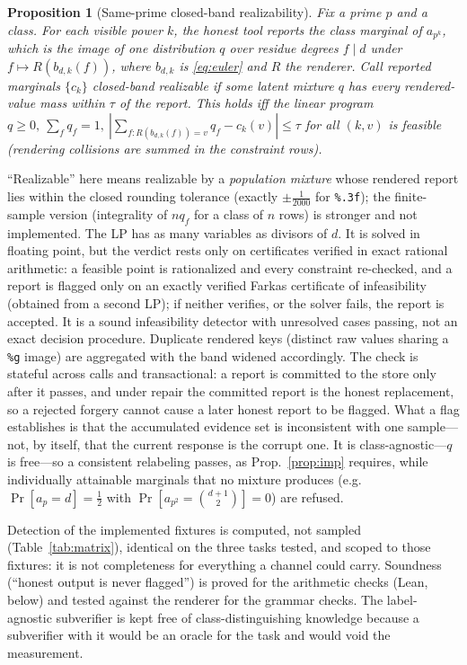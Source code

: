 \documentclass[conference]{IEEEtran}
\newtheorem{proposition}{Proposition}
\begin{document}
\begin{proposition}[Same-prime closed-band realizability]\label{prop:joint}
Fix a prime $p$ and a class. For each visible power $k$, the honest
tool reports the class marginal of $a_{p^k}$, which is the image of
one distribution $q$ over residue degrees $f\mid d$ under
$f\mapsto R(b_{d,k}(f))$, where $b_{d,k}$ is \eqref{eq:euler} and $R$
the renderer. Call reported marginals $\{c_k\}$ \emph{closed-band
realizable} if some latent mixture $q$ has every rendered-value mass
within $\tau$ of the report. This holds iff the linear program
$q\ge0,\ \sum_f q_f=1,\ |\sum_{f:R(b_{d,k}(f))=v}q_f-c_k(v)|\le\tau$
for all $(k,v)$ is feasible (rendering collisions are summed in the
constraint rows).
\end{proposition}
``Realizable'' here means realizable by a \emph{population mixture}
whose rendered report lies within the closed rounding tolerance
(exactly $\pm\tfrac{1}{2000}$ for \texttt{\%.3f}); the finite-sample
version (integrality of $nq_f$ for a class of $n$ rows) is stronger
and not implemented. The LP has as many variables as divisors of $d$.
It is solved in floating point, but the verdict rests only on
certificates verified in exact rational arithmetic: a feasible point is
rationalized and every constraint re-checked, and a report is flagged
only on an exactly verified Farkas certificate of infeasibility
(obtained from a second LP); if neither verifies, or the solver
fails, the report is accepted. It is a sound infeasibility detector
with unresolved cases passing, not an exact decision procedure.
Duplicate rendered keys (distinct raw values sharing a \texttt{\%g}
image) are aggregated with the band widened accordingly. The check is
stateful across calls and transactional: a report is committed to the
store only after it passes, and under repair the committed report is
the honest replacement, so a rejected forgery cannot cause a later
honest report to be flagged. What a flag establishes is that the
accumulated evidence set is inconsistent with one sample---not, by
itself, that the current response is the corrupt one. It is class-agnostic---$q$ is free---so a consistent
relabeling passes, as Prop.~\ref{prop:imp} requires, while
individually attainable marginals that no mixture produces (e.g.\
$\Pr[a_p{=}d]=\tfrac12$ with $\Pr[a_{p^2}{=}\binom{d+1}{2}]=0$) are
refused.

Detection of the implemented fixtures is computed, not sampled
(Table~\ref{tab:matrix}), identical on the three tasks tested, and
scoped to those fixtures: it is not completeness for everything a
channel could carry. Soundness (``honest output is never flagged'')
is proved for the arithmetic checks (Lean, below) and tested against
the renderer for the grammar checks. The label-agnostic subverifier
is kept free of class-distinguishing knowledge because a subverifier
with it would be an oracle for the task and would void the
measurement.
\end{document}
